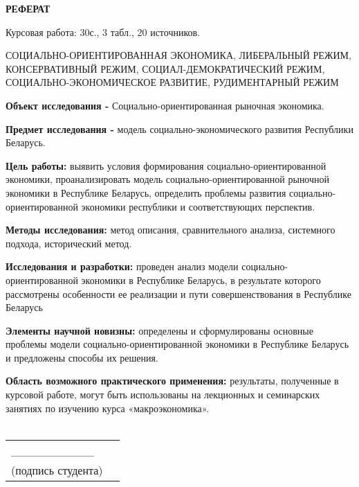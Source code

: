 \documentclass[14pt,a4paper]{article}
\begin{document}
    \newpage
    \begin{center}
        \textbf{\Large{РЕФЕРАТ}}
    \end{center}
    \par
    Курсовая работа: 30с., 3 табл., 20 источников.
    \\
    \par
    \large{СОЦИАЛЬНО-ОРИЕНТИРОВАННАЯ ЭКОНОМИКА, ЛИБЕРАЛЬНЫЙ РЕЖИМ, КОНСЕРВАТИВНЫЙ РЕЖИМ, СОЦИАЛ-ДЕМОКРАТИЧЕСКИЙ РЕЖИМ,}
    \\
    \large{СОЦИАЛЬНО-ЭКОНОМИЧЕСКОЕ РАЗВИТИЕ, РУДИМЕНТАРНЫЙ РЕЖИМ}
    \\
    \par
    \textbf{Объект исследования - } Социально-ориентированная рыночная экономика.
    \par
    \textbf{Предмет исследования - } модель социально-экономического развития Республики Беларусь.
    \par
    \textbf{Цель работы:} выявить условия формирования социально-ориентированной экономики, проанализировать модель социально-ориентированной рыночной экономики в Республике Беларусь, определить проблемы развития социально-ориентированной экономики республики и соответствующих перспектив.
    \par
    \textbf{Методы исследования:} метод описания, сравнительного анализа, системного подхода, исторический метод.
    \par
    \textbf{Исследования и разработки:} проведен анализ модели социально-ориентированной экономики в Республике Беларусь, в результате которого рассмотрены особенности ее реализации и пути совершенствования в Республике Беларусь
    \par
    \textbf{Элементы научной новизны:} определены и сформулированы основные проблемы модели социально-ориентированной экономики в Республике Беларусь и предложены способы их решения.
    \par
    \textbf{Область возможного практического применения:} результаты, полученные в курсовой работе, могут быть использованы на лекционных и семинарских занятиях по изучению курса «макроэкономика».
    \\
    \\
    \hfill\begin{tabular}{lp{.5\linewidth}@{}}
              \_\_\_\_\_\_\_\_\_\_
              \\
              (подпись студента) \\
    \end{tabular}
\end{document}
